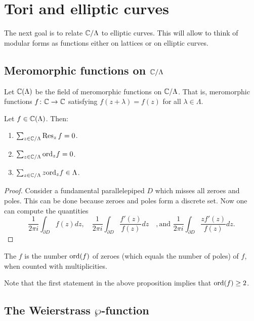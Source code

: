 \section{Tori and elliptic curves}
The next goal is to relate $\mathbb{C}/\Lambda$ to elliptic curves. This will allow to think of modular forms as functions either on lattices or on elliptic curves.

\subsection{Meromorphic functions on \texorpdfstring{$\mathbb{C}/\Lambda$}{C/L}}
\label{sec:meromorphic-functions-CmodLambda}

Let $\mathbb{C}(\Lambda)$ be the field of meromorphic functions on $\mathbb{C}/\Lambda$. That is, meromorphic functions $f\colon\mathbb{C}\to\mathbb{C}$ satisfying $f(z+\lambda)=f(z)$ for all $\lambda\in\Lambda$.
\begin{proposition}
  Let $f\in\mathbb{C}(\Lambda)$. Then:
  \begin{enumerate}
  \item $\sum_{z\in\mathbb{C}/\Lambda} \operatorname{Res}_z f = 0$.
  \item $\sum_{z\in\mathbb{C}/\Lambda} {\text{ord}}_z f = 0$.
  \item $\sum_{z\in\mathbb{C}/\Lambda} z{\text{ord}}_z f\in\Lambda$.
  \end{enumerate}
\end{proposition}
\begin{proof}
  Consider a fundamental parallelepiped $D$ which misses all zeroes and poles. This can be done because zeroes and poles form a discrete set. Now one can compute the quantities
\[
\frac{1}{2\pi i} \int_{\partial D} f(z)dz,\quad \frac{1}{2\pi i} \int_{\partial D} \frac{f'(z)}{f(z)}dz\quad, \text{and }\frac{1}{2\pi i} \int_{\partial D} \frac{zf'(z)}{f(z)}dz.
\]
\end{proof}
\begin{definition}
  The  $f$ is the number ${\text{ord}}(f)$ of zeroes (which equals the number of poles) of $f$, when counted with multiplicities.
\end{definition}
Note that the first statement in the above proposition implies that ${\text{ord}}(f)\geq 2$.

\subsection{The Weierstrass \texorpdfstring{$\wp$}{P}-function}
\label{sec:weierstrass-pe}

